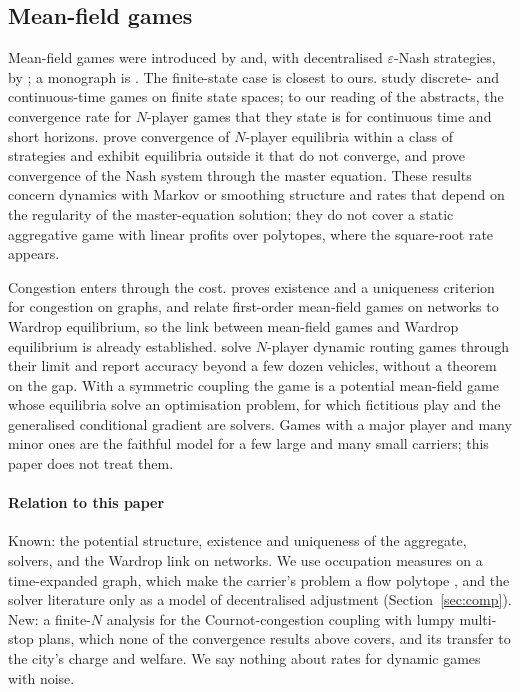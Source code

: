 \documentclass[preprint,11pt,authoryear]{elsarticle}
\theoremstyle{plain}
\theoremstyle{remark}
\begin{document}
\subsection{Mean-field games}\label{sec:rw-mfg}

Mean-field games were introduced by \citet{LasryLions2007} and, with decentralised $\varepsilon$-Nash strategies, by \citet{HuangMalhameCaines2006}; a monograph is \citet{CarmonaDelarue2018}. The finite-state case is closest to ours. \citet{GomesMohrSouza2010,GomesMohrSouza2013} study discrete- and continuous-time games on finite state spaces; to our reading of the abstracts, the convergence rate for $N$-player games that they state is for continuous time and short horizons. \citet{DoncelGastGaujal2019} prove convergence of $N$-player equilibria within a class of strategies and exhibit equilibria outside it that do not converge, and \citet{CDLL2019} prove convergence of the Nash system through the master equation. These results concern dynamics with Markov or smoothing structure and rates that depend on the regularity of the master-equation solution; they do not cover a static aggregative game with linear profits over polytopes, where the square-root rate appears.

Congestion enters through the cost. \citet{Gueant2015} proves existence and a uniqueness criterion for congestion on graphs, and \citet{AlSaleh2024} relate first-order mean-field games on networks to Wardrop equilibrium, so the link between mean-field games and Wardrop equilibrium is already established. \citet{Cabannes2021} solve $N$-player dynamic routing games through their limit and report accuracy beyond a few dozen vehicles, without a theorem on the gap. With a symmetric coupling the game is a potential mean-field game whose equilibria solve an optimisation problem, for which fictitious play \citep{CardaliaguetHadikhanloo2017} and the generalised conditional gradient \citep{LavignePfeiffer2023} are solvers. Games with a major player and many minor ones \citep{Huang2010} are the faithful model for a few large and many small carriers; this paper does not treat them.

\paragraph{Relation to this paper} Known: the potential structure, existence and uniqueness of the aggregate, solvers, and the Wardrop link on networks. We use occupation measures on a time-expanded graph, which make the carrier's problem a flow polytope \citep{CalderoneSastry2017}, and the solver literature only as a model of decentralised adjustment (Section~\ref{sec:comp}). New: a finite-$N$ analysis for the Cournot-congestion coupling with lumpy multi-stop plans, which none of the convergence results above covers, and its transfer to the city's charge and welfare. We say nothing about rates for dynamic games with noise.
\end{document}
